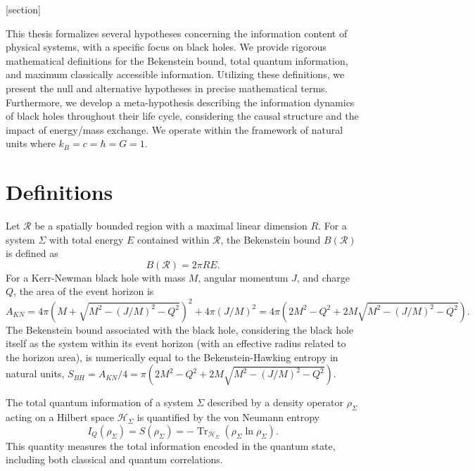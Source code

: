 





\theoremstyle{definition}
[section]














	
	
		This thesis formalizes several hypotheses concerning the information content of physical systems, with a specific focus on black holes. We provide rigorous mathematical definitions for the Bekenstein bound, total quantum information, and maximum classically accessible information. Utilizing these definitions, we present the null and alternative hypotheses in precise mathematical terms. Furthermore, we develop a meta-hypothesis describing the information dynamics of black holes throughout their life cycle, considering the causal structure and the impact of energy/mass exchange. We operate within the framework of natural units where $k_B = c = \hbar = G = 1$.

	
	\section{Definitions}
	
	\begin{definition}
		Let $\mathcal{R}$ be a spatially bounded region with a maximal linear dimension $R$. For a system $\Sigma$ with total energy $E$ contained within $\mathcal{R}$, the Bekenstein bound $B(\mathcal{R})$ is defined as
		$$B(\mathcal{R}) = 2 \pi R E.$$
		For a Kerr-Newman black hole with mass $M$, angular momentum $J$, and charge $Q$, the area of the event horizon is
		$$A_{KN} = 4 \pi \left( M + \sqrt{M^2 - (J/M)^2 - Q^2} \right)^2 + 4 \pi (J/M)^2 = 4 \pi \left( 2 M^2 - Q^2 + 2 M \sqrt{M^2 - (J/M)^2 - Q^2} \right).$$
		The Bekenstein bound associated with the black hole, considering the black hole itself as the system within its event horizon (with an effective radius related to the horizon area), is numerically equal to the Bekenstein-Hawking entropy in natural units, $S_{BH} = A_{KN} / 4 = \pi \left( 2 M^2 - Q^2 + 2 M \sqrt{M^2 - (J/M)^2 - Q^2} \right)$.
	\end{definition}
	
	\begin{definition}
		The total quantum information of a system $\Sigma$ described by a density operator $\rho_\Sigma$ acting on a Hilbert space $\mathcal{H}_\Sigma$ is quantified by the von Neumann entropy
		$$I_Q(\rho_\Sigma) = S(\rho_\Sigma) = - \operatorname{Tr}_{\mathcal{H}_\Sigma}(\rho_\Sigma \ln \rho_\Sigma).$$
		This quantity measures the total information encoded in the quantum state, including both classical and quantum correlations.
	\end{definition}
	
